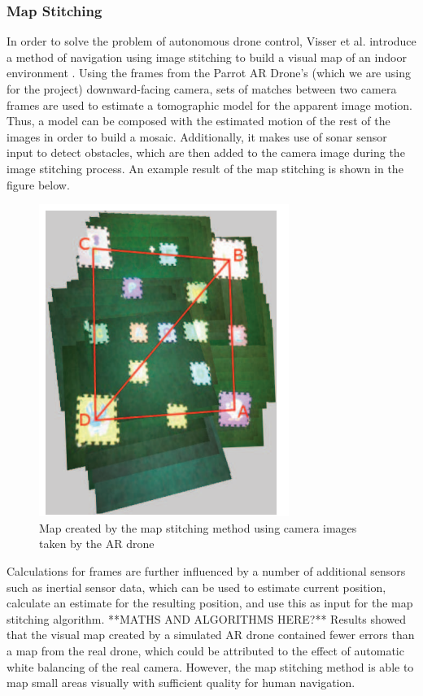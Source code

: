 \subsubsection{Map Stitching}
In order to solve the problem of autonomous drone control, Visser et al. introduce a method of navigation using image stitching to build a visual map of an indoor environment \cite{arnoudvisser2011}. Using the frames from the Parrot AR Drone’s (which we are using for the project) downward-facing camera, sets of matches between two camera frames are used to estimate a tomographic model for the apparent image motion. Thus, a model can be composed with the estimated motion of the rest of the images in order to build a mosaic. Additionally, it makes use of sonar sensor input to detect obstacles, which are then added to the camera image during the image stitching process. An example result of the map stitching is shown in the figure below.

\begin{figure}
\centering	
\includegraphics[scale=0.2]{img/mapstitch}	
\caption{Map created by the map stitching method using camera images taken by the AR drone }
\end{figure}

Calculations for frames are further influenced by a number of additional sensors such as inertial sensor data, which can be used to estimate current position, calculate an estimate for the resulting position, and use this as input for the map stitching algorithm. 
**MATHS AND ALGORITHMS HERE?**
Results showed that the visual map created by a simulated AR drone contained fewer errors than a map from the real drone, which could be attributed to the effect of automatic white balancing of the real camera. However, the map stitching method is able to map small areas visually with sufficient quality for human navigation.

